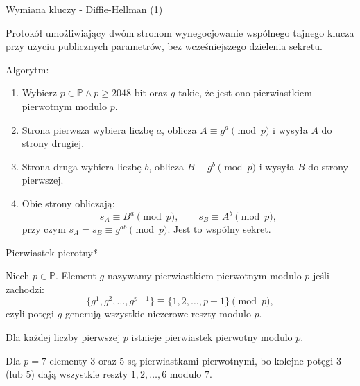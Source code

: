 \documentclass[polish,envcountsect,10pt]{beamer}
\begin{document}
\begin{frame}{Wymiana kluczy - Diffie-Hellman (1)}
        \begin{definition}
            Protokół umożliwiający dwóm stronom wynegocjowanie wspólnego tajnego klucza przy użyciu publicznych parametrów, bez wcześniejszego dzielenia sekretu.
        \end{definition}

        Algorytm:
        \begin{enumerate}
            \item Wybierz $p \in \mathbb{P} \land  p \ge 2048 \text{ bit}$ oraz $g$ takie, że jest ono pierwiastkiem pierwotnym modulo $p$.
            \item Strona pierwsza wybiera liczbę $a$, oblicza $A \equiv g^{a}\pmod{p}$ i wysyła $A$ do strony drugiej.
            \item Strona druga wybiera liczbę $b$, oblicza $B \equiv g^{b}\pmod{p}$ i wysyła $B$ do strony pierwszej.
            \item Obie strony obliczają:
            \[
                s_A \equiv B^{a}\pmod{p},\qquad s_B \equiv A^{b}\pmod{p},
            \]
            przy czym $s_A = s_B \equiv g^{ab}\pmod{p}$. Jest to wspólny sekret.
        \end{enumerate}
        
\end{frame}

\begin{frame}{{Pierwiastek pierotny*}}
\begin{definition}
            Niech \(p\in\mathbb{P}\). Element \(g\) nazywamy pierwiastkiem pierwotnym modulo \(p\) jeśli zachodzi:
            \[
                \{g^1,g^2,\dots,g^{p-1}\}\equiv\{1,2,\dots,p-1\}\pmod p,
            \]
            czyli potęgi \(g\) generują wszystkie niezerowe reszty modulo \(p\).
        \end{definition}

        \begin{theorem}
            Dla każdej liczby pierwszej \(p\) istnieje pierwiastek pierwotny modulo \(p\).
        \end{theorem}

        \begin{example}
            Dla \(p=7\) elementy \(3\) oraz \(5\) są pierwiastkami pierwotnymi, bo kolejne potęgi \(3\) (lub \(5\)) dają wszystkie reszty \(1,2,\dots,6\) modulo \(7\).
        \end{example}
\end{frame}
\end{document}
